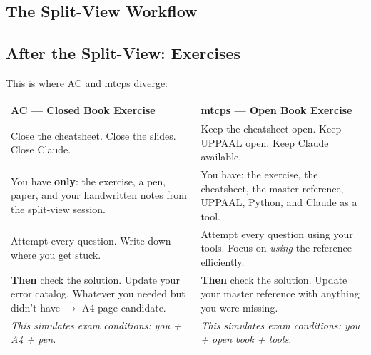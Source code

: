 \documentclass[11pt,a4paper]{article}
\begin{document}
\subsection{The Split-View Workflow}

\begin{center}
\end{center}

\subsection{After the Split-View: Exercises}

This is where AC and mtcps diverge:

\begin{center}
\renewcommand{\arraystretch}{1.4}
\begin{tabular}{p{7cm}p{7cm}}
\toprule
\textcolor{accolor}{\textbf{AC --- Closed Book Exercise}} & \textcolor{mtcpscolor}{\textbf{mtcps --- Open Book Exercise}} \\
\midrule
Close the cheatsheet. Close the slides. Close Claude. & Keep the cheatsheet open. Keep UPPAAL open. Keep Claude available. \\
\midrule
You have \textbf{only}: the exercise, a pen, paper, and your handwritten notes from the split-view session. & You have: the exercise, the cheatsheet, the master reference, UPPAAL, Python, and Claude as a tool. \\
\midrule
Attempt every question. Write down where you get stuck. & Attempt every question using your tools. Focus on \textit{using} the reference efficiently. \\
\midrule
\textbf{Then} check the solution. Update your error catalog. Whatever you needed but didn't have $\rightarrow$ A4 page candidate. & \textbf{Then} check the solution. Update your master reference with anything you were missing. \\
\midrule
\textit{This simulates exam conditions: you + A4 + pen.} & \textit{This simulates exam conditions: you + open book + tools.} \\
\bottomrule
\end{tabular}
\end{center}
\end{document}
